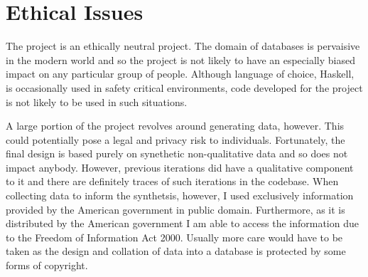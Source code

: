 \chapter*{Ethical Issues}
\begin{comment}
You are required to include a short discussion of ethical, legal, societal and professional issues that are relevant to your project (usually 1 to 2 pages long). This should fit in the most appropriate section of your project report, often the Background or Conclusions section.
\end{comment}
The project is an ethically neutral project. The domain of databases is
pervaisive in the modern world and so the project is not likely to have an
especially biased impact on any particular group of people. Although language of
choice, Haskell, is occasionally used in safety critical environments, code
developed for the project is not likely to be used in such situations.

A large portion of the project revolves around generating data, however. This
could potentially pose a legal and privacy risk to individuals. Fortunately, the
final design is based purely on synethetic non-qualitative data and so does not
impact anybody. However, previous iterations did have a qualitative component to
it and there are definitely traces of such iterations in the codebase. When
collecting data to inform the synthetsis, however, I used exclusively
information provided by the American government in public domain. Furthermore,
as it is distributed by the American government I am able to access the
information due to the Freedom of Information Act 2000. Usually more care would
have to be taken as the design and collation of data into a database is
protected by some forms of copyright.
